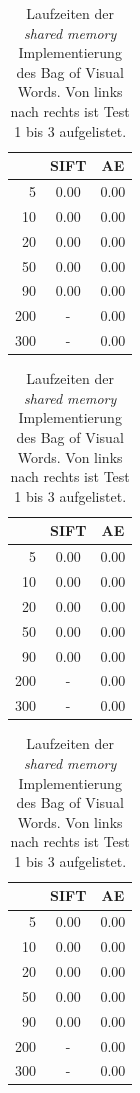 \begin{table}
    \hfill
    \begin{tabular}[t]{ | r | c | c |}
    \hline
	     & SIFT & AE \\ \hline    
    5    & 0.00 & 0.00 \\ \hline
    10   & 0.00 & 0.00 \\ \hline
    20   & 0.00 & 0.00 \\ \hline
    50   & 0.00 & 0.00 \\ \hline
    90   & 0.00 & 0.00 \\ \hline
	200  & -    & 0.00 \\ \hline
	300  & -    & 0.00 \\ \hline    
    \end{tabular}
    \hfill
    \begin{tabular}[t]{ | r | c | c |}
    \hline
	     & SIFT & AE \\ \hline    
    5    & 0.00 & 0.00 \\ \hline
    10   & 0.00 & 0.00 \\ \hline
    20   & 0.00 & 0.00 \\ \hline
    50   & 0.00 & 0.00 \\ \hline
    90   & 0.00 & 0.00 \\ \hline
	200  & -    & 0.00 \\ \hline
	300  & -    & 0.00 \\ \hline
	\end{tabular}
    \hfill
    \begin{tabular}[t]{ | r | c | c |}
    \hline
	     & SIFT & AE \\ \hline    
    5    & 0.00 & 0.00 \\ \hline
    10   & 0.00 & 0.00 \\ \hline
    20   & 0.00 & 0.00 \\ \hline
    50   & 0.00 & 0.00 \\ \hline
    90   & 0.00 & 0.00 \\ \hline
	200  & -    & 0.00 \\ \hline
	300  & -    & 0.00 \\ \hline
	\end{tabular}
    \hfill
	\caption{Laufzeiten der \textit{shared memory} Implementierung des Bag of Visual Words. Von links nach rechts ist Test 1 bis 3 aufgelistet.}
\end{table}